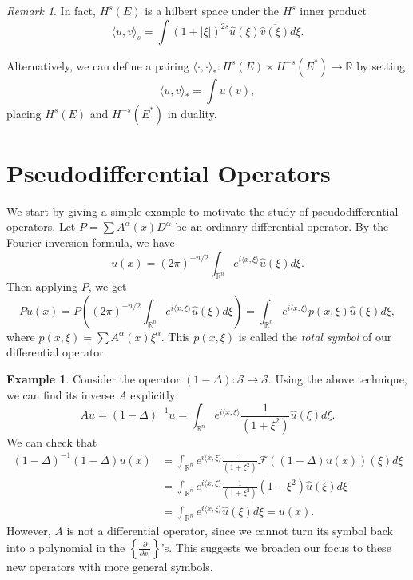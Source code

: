 \documentclass[14pt, reqno]{extarticle}
\theoremstyle{plain}
\theoremstyle{definition}
\newtheorem*{example}{Example}
\theoremstyle{remark}
\newtheorem*{remark}{Remark}
\newcommand{\RR}{\mathbb{R}}
\newcommand{\der}[2]{\frac{\partial #1}{\partial #2}}
\begin{document}
\begin{remark}
    In fact, $H^s(E)$ is a hilbert space under the $H^s$ inner product
    \[
        \langle u, v\rangle_s = \int {(1 + |\xi|)}^{2s}\hat{u}(\xi)\overline{\hat{v}(\xi)}d\xi.
    \]

    Alternatively, we can define a pairing 
    $\langle\cdot,\cdot\rangle_*: H^s(E) \times H^{-s}(E^*) \to \RR$ by setting 
    \[
        \langle u, v\rangle_* = \int u(v),
    \]
    placing $H^s(E)$ and $H^{-s}(E^*)$ in duality. 
\end{remark}

\section{Pseudodifferential Operators}

We start by giving a simple example to motivate the study of pseudodifferential operators. Let
$P = \sum A^\alpha(x) D^\alpha$ be an ordinary differential operator. By the Fourier inversion formula,
we have 
\[
    u(x) = (2\pi)^{-n/2}\int_{\RR^n}e^{i\langle x,\xi\rangle} \widehat{u}(\xi)d\xi.
\]
Then applying $P$, we get
\begin{equation}\label{symbol}
    Pu(x) = P\left((2\pi)^{-n/2}\int_{\RR^n}e^{i\langle x,\xi\rangle} \widehat{u}(\xi)d\xi\right)
    = \int_{\RR^n} e^{i\langle x,\xi\rangle}p(x,\xi)\widehat{u}(\xi)d\xi,
\end{equation}
where $p(x,\xi) = \sum A^\alpha(x) \xi^\alpha$. This $p(x,\xi)$ is called the \textit{total symbol}
of our differential operator

\begin{example}
    Consider the operator $(1 - \Delta): \mathscr{S} \to \mathscr{S}$. Using the above technique,
    we can find its inverse $A$ explicitly:
    \[
        Au = (1-\Delta)^{-1}u = \int_{\RR^n} e^{i\langle x,\xi\rangle} \frac{1}{(1 + \xi^2)}\widehat{u}(\xi)d\xi.
    \]
    We can check that
    \begin{align}
        (1-\Delta)^{-1}(1 - \Delta) u(x) &= \int_{\RR^n} e^{i\langle x,\xi\rangle}\frac{1}{(1 + \xi^2)}
        \mathcal{F}((1-\Delta)u(x))(\xi)d\xi \\
        &= \int_{\RR^n} e^{i\langle x,\xi\rangle}\frac{1}{(1 + \xi^2)}(1-\xi^2)\widehat{u}(\xi)d\xi\\
        &=  \int_{\RR^n} e^{i\langle x,\xi\rangle}\widehat{u}(\xi)d\xi = u(x).
    \end{align}
    However, $A$ is not a differential operator, since we cannot turn its symbol back
    into a polynomial in the $\left\{\der{}{x_i}\right\}$'s. This suggests 
    we broaden our focus to these new operators with more general symbols.
\end{example}
\end{document}
